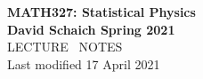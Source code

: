 \documentclass[12 pt]{article} %
\begin{document}
\thispagestyle{empty}
\begin{center}
  {\LARGE \textbf{MATH327: Statistical Physics}} \\[6 pt]
  \textbf{David Schaich \qquad\qquad\qquad\qquad Spring 2021} \\[48 pt]
  {\LARGE LECTURE \ NOTES} \\[6 pt]
  Last modified 17 April 2021
\end{center}
\renewcommand{\contentsname}{}
\setcounter{tocdepth}{1}
\tableofcontents



\newpage


\newpage


\newpage


\newpage


\newpage


\newpage


\newpage


\newpage


\newpage


\newpage


\newpage


\newpage




\end{document}
